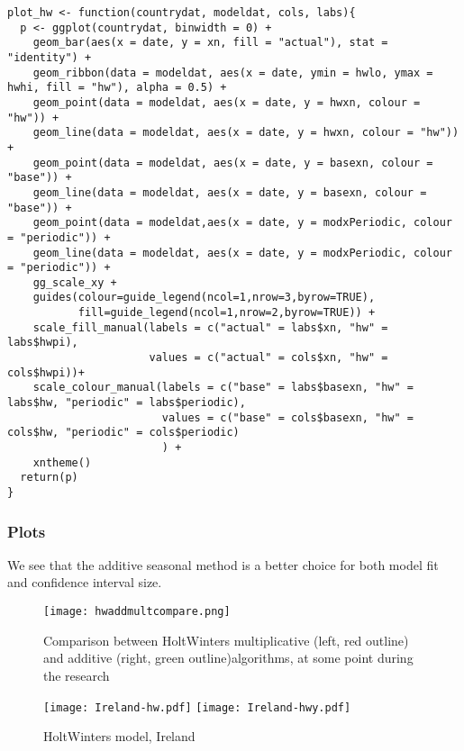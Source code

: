 \begin{lstlisting}[frame=single, caption = {Plot HoltWinters Model}]
plot_hw <- function(countrydat, modeldat, cols, labs){
  p <- ggplot(countrydat, binwidth = 0) + 
    geom_bar(aes(x = date, y = xn, fill = "actual"), stat = "identity") + 
    geom_ribbon(data = modeldat, aes(x = date, ymin = hwlo, ymax = hwhi, fill = "hw"), alpha = 0.5) +
    geom_point(data = modeldat, aes(x = date, y = hwxn, colour = "hw")) + 
    geom_line(data = modeldat, aes(x = date, y = hwxn, colour = "hw")) +
    geom_point(data = modeldat, aes(x = date, y = basexn, colour = "base")) + 
    geom_line(data = modeldat, aes(x = date, y = basexn, colour = "base")) +
    geom_point(data = modeldat,aes(x = date, y = modxPeriodic, colour = "periodic")) +
    geom_line(data = modeldat, aes(x = date, y = modxPeriodic, colour = "periodic")) +
    gg_scale_xy + 
    guides(colour=guide_legend(ncol=1,nrow=3,byrow=TRUE),
           fill=guide_legend(ncol=1,nrow=2,byrow=TRUE)) +
    scale_fill_manual(labels = c("actual" = labs$xn, "hw" = labs$hwpi),
                      values = c("actual" = cols$xn, "hw" = cols$hwpi))+ 
    scale_colour_manual(labels = c("base" = labs$basexn, "hw" = labs$hw, "periodic" = labs$periodic),
                        values = c("base" = cols$basexn, "hw" = cols$hw, "periodic" = cols$periodic)
                        ) +
    xntheme()
  return(p)
}

\end{lstlisting}

\subsubsection{Plots}

We see that the additive seasonal method is a better choice for both model fit and confidence interval size.

\begin{figure}[H]
\begin{center}
\texttt{[image: hwaddmultcompare.png]}
\endminipage
\caption{Comparison between HoltWinters multiplicative (left, red outline) and additive (right, green outline)algorithms, at some point during the research}
\end{center}
\end{figure}

\begin{figure}[H]
  \texttt{[image: Ireland-hw.pdf]} \label{fig:ireland-hw}
\endminipage\hfill
{}
  \texttt{[image: Ireland-hwy.pdf]} \label{fig:ireland-hwy}
\endminipage
\caption{HoltWinters model, Ireland}
\end{figure}

